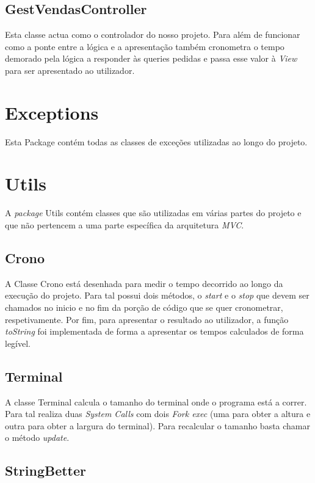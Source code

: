 \documentclass[a4paper]{report}
\begin{document}
\subsection{GestVendasController}

Esta classe actua como o controlador do nosso projeto. Para além de funcionar como a ponte entre
a lógica e a apresentação também cronometra o tempo demorado pela lógica a responder às queries pedidas
e passa esse valor à \textit{View} para ser apresentado ao utilizador.

\section{Exceptions}

Esta Package contém todas as classes de exceções utilizadas ao longo do projeto.

\section{Utils}

A \textit{package} Utils contém classes que são utilizadas em várias partes do projeto e que não
pertencem a uma parte específica da arquitetura \textit{MVC}.

\subsection{Crono}

A Classe Crono está desenhada para medir o tempo decorrido ao longo da execução do projeto.
Para tal possui dois métodos, o \textit{start} e o \textit{stop} que devem ser chamados no
inicio e no fim da porção de código que se quer cronometrar, respetivamente.
Por fim, para apresentar o resultado ao utilizador, a função \textit{toString} foi implementada
de forma a apresentar os tempos calculados de forma legível.

\subsection{Terminal}

A classe Terminal calcula o tamanho do terminal onde o programa está a correr.
Para tal realiza duas \textit{System Calls} com dois \textit{Fork exec} (uma para obter a altura
e outra para obter a largura do terminal).
Para recalcular o tamanho basta chamar o método \textit{update}.

\subsection{StringBetter}
\end{document}
